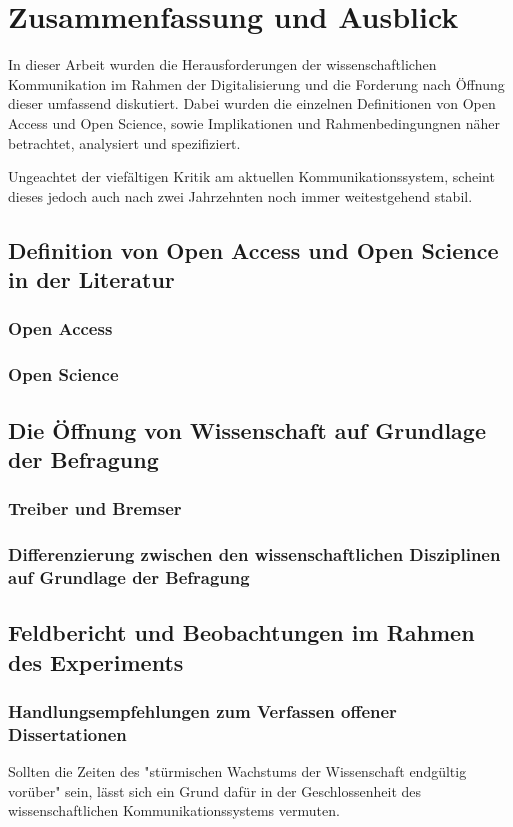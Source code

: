 \chapter{Zusammenfassung und Ausblick}

In dieser Arbeit wurden die Herausforderungen der wissenschaftlichen Kommunikation im Rahmen der Digitalisierung und die Forderung nach Öffnung dieser umfassend diskutiert. Dabei wurden die einzelnen Definitionen von Open Access und Open Science, sowie Implikationen und Rahmenbedingungnen näher betrachtet, analysiert und spezifiziert.

Ungeachtet der viefältigen Kritik am aktuellen Kommunikationssystem, scheint dieses jedoch auch nach zwei Jahrzehnten noch immer weitestgehend stabil.

\section{Definition von Open Access und Open Science in der Literatur}
\subsection{Open Access}
\subsection{Open Science}
\section{Die Öffnung von Wissenschaft auf Grundlage der Befragung}
\subsection{Treiber und Bremser}
\subsection{Differenzierung zwischen den wissenschaftlichen Disziplinen auf Grundlage der Befragung}
\section{Feldbericht und Beobachtungen im Rahmen des Experiments}
\subsection{Handlungsempfehlungen zum Verfassen offener Dissertationen}


Sollten die Zeiten des "stürmischen Wachstums der Wissenschaft endgültig vorüber" \cite{K_lbel_2002} sein, lässt sich ein Grund dafür in der Geschlossenheit des wissenschaftlichen Kommunikationssystems vermuten.